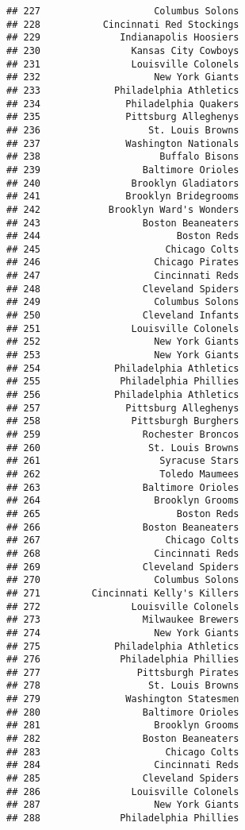 \documentclass[]{article}
\begin{document}
\begin{verbatim}
## 227                    Columbus Solons
## 228           Cincinnati Red Stockings
## 229              Indianapolis Hoosiers
## 230                Kansas City Cowboys
## 231                Louisville Colonels
## 232                    New York Giants
## 233             Philadelphia Athletics
## 234               Philadelphia Quakers
## 235               Pittsburg Alleghenys
## 236                   St. Louis Browns
## 237               Washington Nationals
## 238                     Buffalo Bisons
## 239                  Baltimore Orioles
## 240                Brooklyn Gladiators
## 241               Brooklyn Bridegrooms
## 242            Brooklyn Ward's Wonders
## 243                  Boston Beaneaters
## 244                        Boston Reds
## 245                      Chicago Colts
## 246                    Chicago Pirates
## 247                    Cincinnati Reds
## 248                  Cleveland Spiders
## 249                    Columbus Solons
## 250                  Cleveland Infants
## 251                Louisville Colonels
## 252                    New York Giants
## 253                    New York Giants
## 254             Philadelphia Athletics
## 255              Philadelphia Phillies
## 256             Philadelphia Athletics
## 257               Pittsburg Alleghenys
## 258                Pittsburgh Burghers
## 259                  Rochester Broncos
## 260                   St. Louis Browns
## 261                     Syracuse Stars
## 262                     Toledo Maumees
## 263                  Baltimore Orioles
## 264                    Brooklyn Grooms
## 265                        Boston Reds
## 266                  Boston Beaneaters
## 267                      Chicago Colts
## 268                    Cincinnati Reds
## 269                  Cleveland Spiders
## 270                    Columbus Solons
## 271         Cincinnati Kelly's Killers
## 272                Louisville Colonels
## 273                  Milwaukee Brewers
## 274                    New York Giants
## 275             Philadelphia Athletics
## 276              Philadelphia Phillies
## 277                 Pittsburgh Pirates
## 278                   St. Louis Browns
## 279               Washington Statesmen
## 280                  Baltimore Orioles
## 281                    Brooklyn Grooms
## 282                  Boston Beaneaters
## 283                      Chicago Colts
## 284                    Cincinnati Reds
## 285                  Cleveland Spiders
## 286                Louisville Colonels
## 287                    New York Giants
## 288              Philadelphia Phillies

\end{verbatim}
\end{document}
